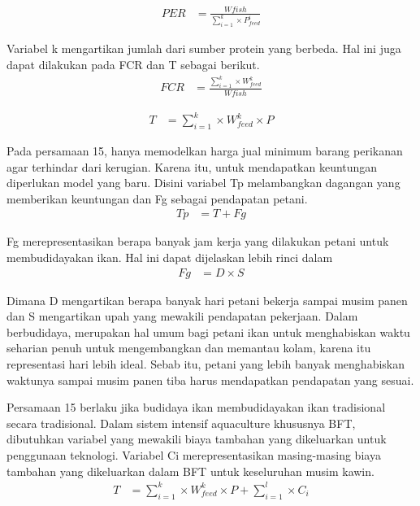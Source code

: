 \begin{equation}
    \begin{split}
		PER
		&= \frac{Wfish}{\sum_{i=1}^k \times P^i_{feed}}
    \end{split}
\end{equation}

Variabel k mengartikan jumlah dari sumber protein yang berbeda. Hal ini juga dapat dilakukan pada FCR dan T sebagai berikut.
\begin{equation}
    \begin{split}
		FCR
		&= \frac{\sum_{i=1}^k \times W^k_{feed}}{Wfish}
    \end{split}
\end{equation}

\begin{equation}
    \begin{split}
		T
		&= \sum_{i=1}^k \times W^k_{feed} \times P
    \end{split}
\end{equation}

Pada persamaan 15, hanya memodelkan harga jual minimum barang perikanan agar terhindar dari kerugian. Karena itu, untuk mendapatkan keuntungan diperlukan model yang baru. Disini variabel Tp melambangkan dagangan yang memberikan keuntungan dan Fg sebagai pendapatan petani.
\begin{equation}
    \begin{split}
		Tp
		&= T + Fg
    \end{split}
\end{equation}

Fg merepresentasikan berapa banyak jam kerja yang dilakukan petani untuk membudidayakan ikan. Hal ini dapat dijelaskan lebih rinci dalam
\begin{equation}
    \begin{split}
		Fg
		&= D \times S
    \end{split}
\end{equation}

Dimana D mengartikan berapa banyak hari petani bekerja sampai musim panen dan S mengartikan upah yang mewakili pendapatan pekerjaan. Dalam berbudidaya, merupakan hal umum bagi petani ikan untuk menghabiskan waktu seharian penuh untuk mengembangkan dan memantau kolam, karena itu representasi hari lebih ideal. Sebab itu, petani yang lebih banyak menghabiskan waktunya sampai musim panen tiba harus mendapatkan pendapatan yang sesuai.

Persamaan 15 berlaku jika budidaya ikan membudidayakan ikan tradisional secara tradisional. Dalam sistem intensif aquaculture khususnya BFT, dibutuhkan variabel yang mewakili biaya tambahan yang dikeluarkan untuk penggunaan teknologi. Variabel Ci merepresentasikan masing-masing biaya tambahan yang dikeluarkan dalam BFT untuk keseluruhan musim kawin.
\begin{equation}
    \begin{split}
		T
		&= \sum_{i=1}^k \times W^k_{feed} \times P + \sum_{i=1}^l \times C_i
    \end{split}
\end{equation}

